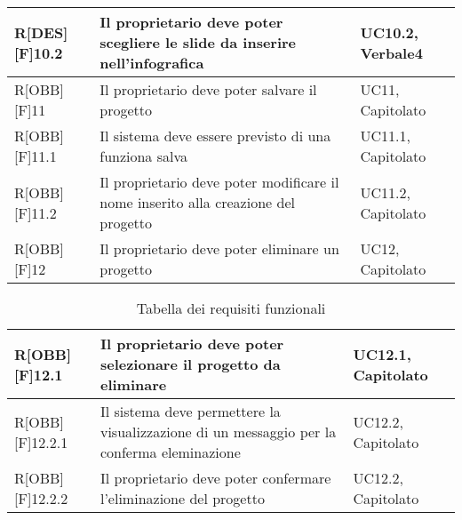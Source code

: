 \begin{table}[h]
\begin{tabular}{|p{}|p{}|p{}|}
R[DES][F]10.2 & Il proprietario deve poter scegliere le slide da inserire nell'infografica & UC10.2, Verbale4 \\ \midrule
R[OBB][F]11 & Il proprietario deve poter salvare il progetto & UC11, Capitolato  \\ \midrule
R[OBB][F]11.1 & Il sistema deve essere previsto di una funziona salva & UC11.1, Capitolato \\ \midrule
R[OBB][F]11.2 & Il proprietario deve poter modificare il nome inserito alla creazione del progetto & UC11.2, Capitolato \\ \midrule
R[OBB][F]12 & Il proprietario deve poter eliminare un progetto & UC12, Capitolato \\ \midrule

		\end{tabular}
	\end{table}
	\newpage
	
	\begin{table}[h]
		\begin{tabular}{|p{}|p{}|p{}|}
			\midrule
			
R[OBB][F]12.1 & Il proprietario deve poter selezionare il progetto da eliminare & UC12.1, Capitolato \\ \midrule
R[OBB][F]12.2.1 & Il sistema deve permettere la visualizzazione di un messaggio per la conferma eleminazione & UC12.2, Capitolato \\ \midrule
R[OBB][F]12.2.2 & Il proprietario deve poter confermare l'eliminazione del progetto  & UC12.2, Capitolato \\ \midrule

		\end{tabular}
		\caption{Tabella dei requisiti funzionali}
	\end{table}
	\newpage